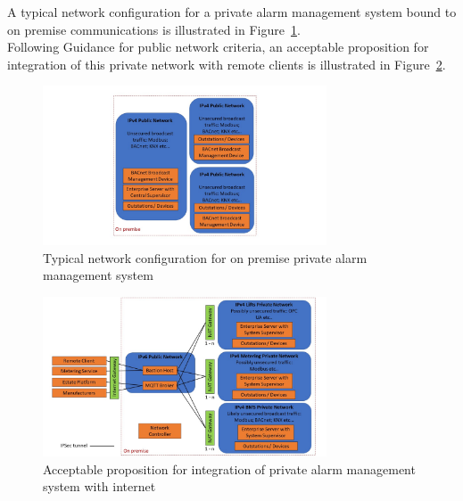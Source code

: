 \documentclass[11pt, oneside]{article}   	%
\begin{document}
A typical network configuration for a private alarm management system bound to on premise communications is illustrated in Figure~\ref{Typical Network Configuration figure}.\\
Following Guidance for public network criteria, an acceptable proposition for integration of this private network with remote clients is illustrated in Figure~\ref{Integrated Network Configuration figure}.

\pagebreak

\FloatBarrier
\begin{figure}
\begin{center}
\includegraphics[width=0.75\textwidth]{typicalPrivateNetwork.jpg}
\caption{Typical network configuration for on premise private alarm management system}
\label{Typical Network Configuration figure}
\end{center}
\end{figure}
\FloatBarrier

\pagebreak

\FloatBarrier
\begin{figure}
\begin{center}
\includegraphics[width=0.75\textwidth]{acceptablePublicNetwork.jpg}
\caption{Acceptable proposition for integration of private alarm management system with internet}
\label{Integrated Network Configuration figure}
\end{center}
\end{figure}
\FloatBarrier
\end{document}
